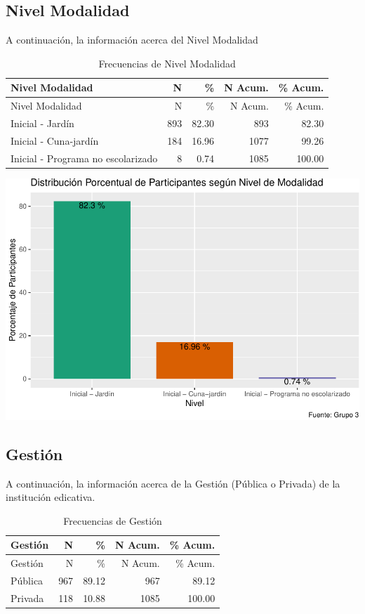 \documentclass[
]{article}
\begin{document}
\subsection{Nivel Modalidad}\label{nivel-modalidad}

A continuación, la información acerca del Nivel Modalidad

\begin{longtable}[]{@{}lrrrr@{}}
\caption{Frecuencias de Nivel Modalidad}\tabularnewline
\toprule\noalign{}
Nivel Modalidad & N & \% & N Acum. & \% Acum. \\
\midrule\noalign{}
\endfirsthead
\toprule\noalign{}
Nivel Modalidad & N & \% & N Acum. & \% Acum. \\
\midrule\noalign{}
\endhead
\bottomrule\noalign{}
\endlastfoot
Inicial - Jardín & 893 & 82.30 & 893 & 82.30 \\
Inicial - Cuna-jardín & 184 & 16.96 & 1077 & 99.26 \\
Inicial - Programa no escolarizado & 8 & 0.74 & 1085 & 100.00 \\
\end{longtable}

\includegraphics{Info_Dinix_02_files/figure-latex/30_NivMod-1.pdf}

\subsection{Gestión}\label{gestiuxf3n}

A continuación, la información acerca de la Gestión (Pública o Privada)
de la institución edicativa.

\begin{longtable}[]{@{}lrrrr@{}}
\caption{Frecuencias de Gestión}\tabularnewline
\toprule\noalign{}
Gestión & N & \% & N Acum. & \% Acum. \\
\midrule\noalign{}
\endfirsthead
\toprule\noalign{}
Gestión & N & \% & N Acum. & \% Acum. \\
\midrule\noalign{}
\endhead
\bottomrule\noalign{}
\endlastfoot
Pública & 967 & 89.12 & 967 & 89.12 \\
Privada & 118 & 10.88 & 1085 & 100.00 \\
\end{longtable}
\end{document}
